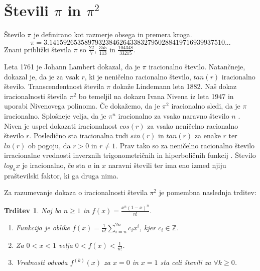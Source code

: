 \documentclass[a4paper]{article}
\theoremstyle{plain}
\newtheorem{trditev}{Trditev}
\newcommand{\odvod}[1]{f^{({#1})}(x)}
\begin{document}
\section*{Števili $\pi$ in $\pi^2$}
Število $\pi$ je definirano kot razmerje obsega in premera kroga. 
\begin{equation*}
\pi = 3.14159265358979323846264338327950288419716939937510...
\end{equation*}
Znani približki števila $\pi$ so $\frac{22}{7}$, $\frac{355}{113}$ in $\frac{104348}{33215}$.

Leta 1761 je Johann Lambert dokazal, da je $\pi$ iracionalno število. Natančneje, dokazal je, da je za vsak $r$, ki je neničelno racionalno število, $tan(r)$ iracionalno število. Transcendentnost števila $\pi$ dokaže Lindemann leta 1882. Naš dokaz iracionalnosti števila $\pi^2$ bo temeljil na dokazu Ivana Nivena iz leta 1947 in uporabi Nivenovega polinoma. Če dokažemo, da je $\pi^2$ iracionalno sledi, da je $\pi$ iracionalno. Splošneje velja, da je $\pi^n$ iracionalno za vsako naravno število $n$ \cite{iracionalna}. Niven je uspel dokazati iracionalnost $cos(r)$ za vsako neničelno racionalno število $r$. Posledično sta iracionalna tudi $sin(r)$ in $tan(r)$ za enake $r$ ter $ln(r)$ ob pogoju, da $r>0$ in $r\ne 1$. Prav tako so za neničelno racionalno število irracionalne vrednosti inverznih trigonometričnih in hiperboličnih funkcij \cite{knjiznica}. Število $log_ax$ je iracionalno, če sta $a$ in $x$ naravni števili ter ima eno izmed njiju praštevilski faktor, ki ga druga nima.

Za razumevanje dokaza o iracionalnosti števila $\pi^2$ je pomembna naslednja trditev:

\begin{trditev}
\label{tr:funkcijaf}
Naj bo $n\ge1$ in $f(x)=\frac{x^n(1-x)^n}{n!}$.
\begin{enumerate}
\item Funkcija je oblike $\displaystyle f(x)=\frac{1}{n!}\sum_{i=n}^{2n}c_ix^i$, kjer $c_i\in\mathbb{Z}$.
\item Za $0<x<1$ velja $0<f(x)<\frac{1}{n!}$.
\item Vrednosti odvoda $\odvod{k}$ za $x=0$ in $x=1$ sta celi števili za $\forall k\ge0$.
\end{enumerate}
\end{trditev}
\end{document}
